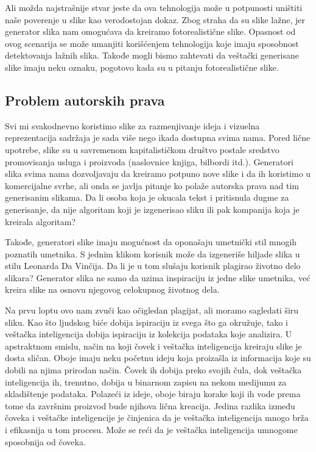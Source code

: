 \documentclass[12pt, letterpaper]{article}
\begin{document}
Ali možda najstrašnije stvar jeste da ova tehnologija može u potpunosti uništiti naše poverenje u slike kao verodostojan dokaz. Zbog straha da su slike lažne, jer generator slika nam omogućava da kreiramo fotorealistične slike. Opasnost od ovog scenarija se može umanjiti korišćenjem tehnologija koje imaju sposobnost detektovanja lažnih slika. Takođe mogli bismo zahtevati da veštački generisane slike imaju neku oznaku, pogotovo kada su u pitanju fotorealistične slike.



\subsection{Problem autorskih prava}

Svi mi svakodnevno koristimo slike za razmenjivanje ideja i vizuelna reprezentacija sadržaja je sada više nego ikada dostupna svima nama. Pored lične upotrebe, slike su u savremenom kapitalističkom društvo postale sredstvo promovisanja usluga i proizvoda (naslovnice knjiga, bilbordi itd.). Generatori slika svima nama dozvoljavaju da kreiramo potpuno nove slike i da ih koristimo u komercijalne svrhe, ali onda se javlja pitanje ko polaže autorska prava nad tim generisanim slikama. Da li osoba koja je okucala tekst i pritisnula dugme za generisanje, da nije algoritam koji je izgenerisao sliku ili pak kompanija koja je kreirala algoritam?

Takođe, generatori slike imaju mogućnost da oponašaju umetnički stil mnogih poznatih umetnika. S jednim klikom korisnik može da izgeneriše hiljade slika u stilu Leonarda Da Vinčija. Da li je u tom slušaju korisnik plagirao životno delo slikara? Generator slika ne samo da uzima inspiraciju iz jedne slike umetnika, već kreira slike na osnovu njegovog celokupnog životnog dela.

Na prvu loptu ovo nam zvuči kao očigledan plagijat, ali moramo sagledati širu sliku. Kao što ljudskog biće dobija ispiraciju iz svega što ga okružuje, tako i veštačka inteligencija dobija ispiraciju iz kolekcija podataka koje analizira. U apstraktnom smislu, način na koji čovek i veštačka inteligencija kreiraju slike je dosta sličan. Oboje imaju neku početnu ideju koja proizašla iz informacija koje su dobili na njima prirodan način. Čovek ih dobija preko svojih čula, dok veštačka inteligencija ih, trenutno, dobija u binarnom zapisu na nekom medijumu za skladištenje podataka. Polazeći iz ideje, oboje biraju korake koji ih vode prema tome da završnim proizvod bude njihova lična kreacija. Jedina razlika između čoveka i veštačke inteligencije je činjenica da je veštačka inteligencija mnogo brža i efikasnija u tom procesu. Može se reći da je veštačka inteligencija umnogome sposobnija od čoveka. 
\end{document}

